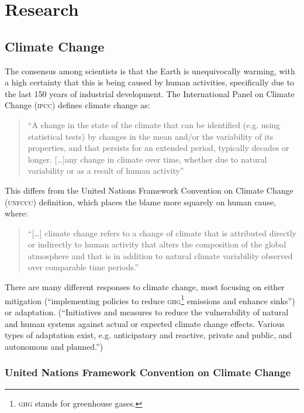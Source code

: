 \section{Research}
\subsection{Climate Change}
The consensus among scientists is that the Earth is unequivocally warming, with a high certainty that this is being caused by human activities, specifically due to the last 150 years of industrial development. The International Panel on Climate Change (\textsc{ipcc}) defines climate change as:

\begin{quote}
``A change in the state of the climate that can be identified (e.g. using statistical tests) by changes in the mean and/or the variability of its properties, and that persists for an extended period, typically decades or longer. [\ldots]any change in climate over time, whether due to natural variability or as a result of human activity''~\cite{IPCC-synthesis-07}
\end{quote}

This differs from the United Nations Framework Convention on Climate Change (\textsc{unfccc}) definition, which places the blame more squarely on human cause, where:

\begin{quote}
``[\ldots] climate change refers to a change of climate that is attributed directly or indirectly to human activity that alters the composition of the global atmosphere and that is in addition to natural climate variability observed over comparable time periods.''~\cite{IPCC-synthesis-07}
\end{quote}

There are many different responses to climate change, most focusing on either mitigation (``implementing policies to reduce \textsc{ghg}\footnote{\textsc{ghg} stands for greenhouse gases.} emissions and enhance sinks'')~\cite{IPCC-glossary-mitigation} or adaptation. (``Initiatives and measures to reduce the vulnerability of natural and human systems against actual or expected climate change effects. Various types of adaptation exist, e.g. anticipatory and reactive, private and public, and autonomous and planned.'')~\cite{IPCC-glossary-adaptation}

\subsubsection{United Nations Framework Convention on Climate Change}

